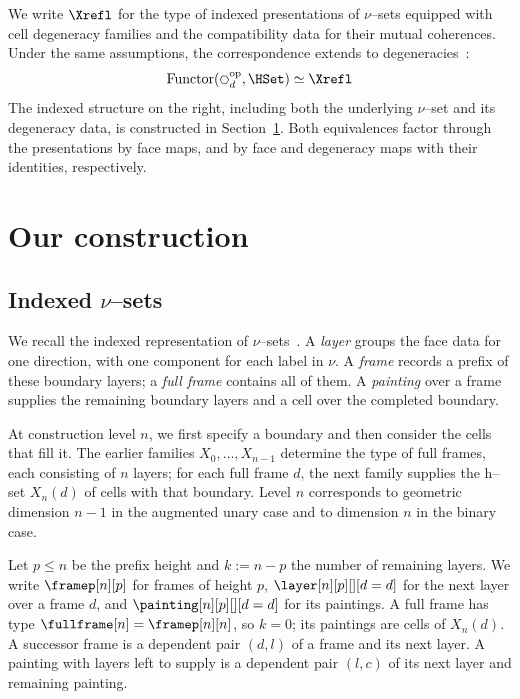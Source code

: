 \documentclass[a4paper,UKenglish,cleveref,autoref]{lipics-v2021}
\newcommand{\linkicon}{\texorpdfstring{\faLink}{🔗}}
\begin{document}
We write $\Xrefl$ for the type of indexed presentations of $\nu$--sets equipped with cell degeneracy families and the compatibility data for their mutual coherences. Under the same assumptions, the correspondence extends to degeneracies~\href{https://github.com/artagnon/bonak/tree/master/theories/Equiv/Dgn}{\linkicon}:
\begin{equation*}
  \label{eq:nudgnset-correspondence}
  \operatorname{Functor}(\hexagon_d^{\mathrm{op}},\HSet)\simeq\Xrefl
\end{equation*}
The indexed structure on the right, including both the underlying $\nu$--set and its degeneracy data, is constructed in Section~\ref{sec:construction}. Both equivalences factor through the presentations by face maps, and by face and degeneracy maps with their identities, respectively.

\section{Our construction}
\label{sec:construction}
\subsection{\texorpdfstring{Indexed $\nu$--sets}{Indexed nu-sets}}
\label{sec:faces}

We recall the indexed representation of $\nu$--sets~\cite{hr25,hr26}\href{https://github.com/artagnon/bonak/tree/master/theories/%BDSet/%BDSet.v}{\linkicon}. A \emph{layer} groups the face data for one direction, with one component for each label in $\nu$. A \emph{frame} records a prefix of these boundary layers; a \emph{full frame} contains all of them. A \emph{painting} over a frame supplies the remaining boundary layers and a cell over the completed boundary.

At construction level $n$, we first specify a boundary and then consider the cells that fill it. The earlier families $X_0,\ldots,X_{n-1}$ determine the type of full frames, each consisting of $n$ layers; for each full frame $d$, the next family supplies the h--set $X_n(d)$ of cells with that boundary. Level $n$ corresponds to geometric dimension $n-1$ in the augmented unary case and to dimension $n$ in the binary case.

Let $p\leq n$ be the prefix height and $k:=n-p$ the number of remaining layers. We write $\framep[n][p]$ for frames of height $p$, $\layer[n][p][][d=d]$ for the next layer over a frame $d$, and $\painting[n][p][][d=d]$ for its paintings. A full frame has type $\fullframe[n]=\framep[n][n]$, so $k=0$; its paintings are cells of $X_n(d)$. A successor frame is a dependent pair $(d,l)$ of a frame and its next layer. A painting with layers left to supply is a dependent pair $(l,c)$ of its next layer and remaining painting.
\end{document}
